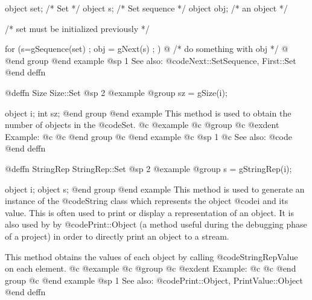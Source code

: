 object  set; /*  Set           */
object  s;   /*  Set sequence  */
object  obj; /*  an object     */

/*  set must be initialized previously  */

for (s=gSequence(set) ; obj = gNext(s) ; )  @{
        /*  do something with obj  */
@}
@end group
@end example
@sp 1
See also:  @code{Next::SetSequence, First::Set}
@end deffn




















@deffn {Size} Size::Set
@sp 2
@example
@group
sz = gSize(i);

object  i;
int     sz;
@end group
@end example
This method is used to obtain the number of objects in the @code{Set}.
@c @example
@c @group
@c @exdent Example:
@c 
@c @end group
@c @end example
@c @sp 1
@c See also:  @code{}
@end deffn










@deffn {StringRep} StringRep::Set
@sp 2
@example
@group
s = gStringRep(i);

object  i;
object  s;
@end group
@end example
This method is used to generate an instance of the @code{String} class
which represents the object @code{i} and its value.  This is often used
to print or display a representation of an object.  It is also used by
by @code{Print::Object} (a method useful during the debugging phase of
a project) in order to directly print an object to a stream.

This method obtains the values of each object by calling
@code{StringRepValue} on each element.
@c @example
@c @group
@c @exdent Example:
@c 
@c @end group
@c @end example
@sp 1
See also:  @code{Print::Object, PrintValue::Object}
@end deffn













